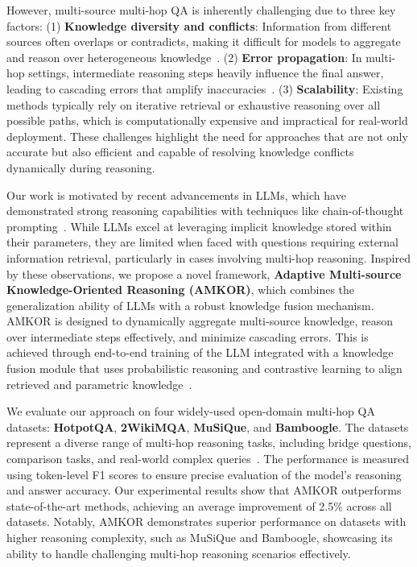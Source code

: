 However, multi-source multi-hop QA is inherently challenging due to three key factors: (1) \textbf{Knowledge diversity and conflicts}: Information from different sources often overlaps or contradicts, making it difficult for models to aggregate and reason over heterogeneous knowledge~\cite{TTQA_RS}. (2) \textbf{Error propagation}: In multi-hop settings, intermediate reasoning steps heavily influence the final answer, leading to cascading errors that amplify inaccuracies~\cite{ContrastiveCoT}. (3) \textbf{Scalability}: Existing methods typically rely on iterative retrieval or exhaustive reasoning over all possible paths, which is computationally expensive and impractical for real-world deployment. These challenges highlight the need for approaches that are not only accurate but also efficient and capable of resolving knowledge conflicts dynamically during reasoning.

Our work is motivated by recent advancements in LLMs, which have demonstrated strong reasoning capabilities with techniques like chain-of-thought prompting~\cite{Wei2022Chain}. While LLMs excel at leveraging implicit knowledge stored within their parameters, they are limited when faced with questions requiring external information retrieval, particularly in cases involving multi-hop reasoning. Inspired by these observations, we propose a novel framework, \textbf{Adaptive Multi-source Knowledge-Oriented Reasoning (AMKOR)}, which combines the generalization ability of LLMs with a robust knowledge fusion mechanism. AMKOR is designed to dynamically aggregate multi-source knowledge, reason over intermediate steps effectively, and minimize cascading errors. This is achieved through end-to-end training of the LLM integrated with a knowledge fusion module that uses probabilistic reasoning and contrastive learning to align retrieved and parametric knowledge~\cite{ProQA2022}.

We evaluate our approach on four widely-used open-domain multi-hop QA datasets: \textbf{HotpotQA}, \textbf{2WikiMQA}, \textbf{MuSiQue}, and \textbf{Bamboogle}. The datasets represent a diverse range of multi-hop reasoning tasks, including bridge questions, comparison tasks, and real-world complex queries~\cite{TTQA_RS,ProQA2022}. The performance is measured using token-level F1 scores to ensure precise evaluation of the model's reasoning and answer accuracy. Our experimental results show that AMKOR outperforms state-of-the-art methods, achieving an average improvement of 2.5\% across all datasets. Notably, AMKOR demonstrates superior performance on datasets with higher reasoning complexity, such as MuSiQue and Bamboogle, showcasing its ability to handle challenging multi-hop reasoning scenarios effectively.

